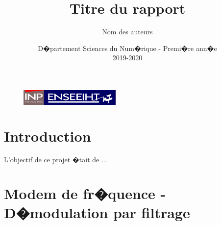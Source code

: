 \documentclass[frenchb]{article}
\begin{document}
\begin{figure}[t]
\centering
\includegraphics[width=5cm]{inp_n7.png}
\end{figure}

\title{\vspace{4cm} \textbf{Titre du rapport}}
\author{Nom des auteurs\\ }
\date{\vspace{7cm} D�partement Sciences du Num�rique - Premi�re ann�e \\
2019-2020 }

\maketitle

\newpage
\tableofcontents
\listoffigures

\newpage
\section{Introduction}
L'objectif de ce projet �tait de ...

\section{Modem de fr�quence - D�modulation par filtrage}
\end{document}
